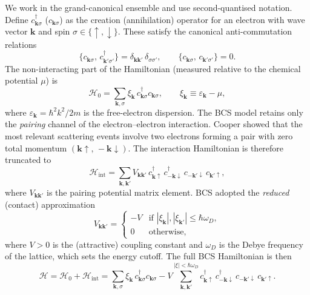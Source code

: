 We work in the grand-canonical ensemble and use second-quantised notation.
Define $c^\dagger_{\mathbf{k}\sigma}$ ($c_{\mathbf{k}\sigma}$) as the creation
(annihilation) operator for an electron with wave vector $\mathbf{k}$ and spin
$\sigma \in \{\uparrow, \downarrow\}$. These satisfy the canonical
anti-commutation relations
\begin{equation}
	\{c_{\mathbf{k}\sigma},\, c^\dagger_{\mathbf{k}'\sigma'}\}
	= \delta_{\mathbf{k}\mathbf{k}'}\,\delta_{\sigma\sigma'}, \qquad
	\{c_{\mathbf{k}\sigma},\, c_{\mathbf{k}'\sigma'}\} = 0.
\end{equation}
The non-interacting part of the Hamiltonian (measured relative to the chemical
potential $\mu$) is
\begin{equation}
	\mathcal{H}_0 = \sum_{\mathbf{k},\sigma} \xi_{\mathbf{k}}\,
	c^\dagger_{\mathbf{k}\sigma} c_{\mathbf{k}\sigma}, \qquad
	\xi_{\mathbf{k}} \equiv \varepsilon_{\mathbf{k}} - \mu,
\end{equation}
where $\varepsilon_{\mathbf{k}} = \hbar^2 k^2 / 2m$ is the free-electron
dispersion. The BCS model retains only the \emph{pairing} channel of the
electron--electron interaction. Cooper showed that the most relevant scattering
events involve two electrons forming a pair with zero total momentum
$(\mathbf{k}\uparrow,\,-\mathbf{k}\downarrow)$. The interaction Hamiltonian is
therefore truncated to
\begin{equation}
	\mathcal{H}_{\mathrm{int}} = \sum_{\mathbf{k},\mathbf{k}'}
	V_{\mathbf{k}\mathbf{k}'}\,
	c^\dagger_{\mathbf{k}\uparrow}\, c^\dagger_{-\mathbf{k}\downarrow}\,
	c_{-\mathbf{k}'\downarrow}\, c_{\mathbf{k}'\uparrow},
\end{equation}
where $V_{\mathbf{k}\mathbf{k}'}$ is the pairing potential matrix element.
BCS adopted the \emph{reduced} (contact) approximation
\begin{equation}
	V_{\mathbf{k}\mathbf{k}'} =
	\begin{cases}
		-V & \text{if } |\xi_{\mathbf{k}}|, |\xi_{\mathbf{k}'}| \leq \hbar\omega_D, \\
		0  & \text{otherwise},
	\end{cases}
	\label{eq:BCS_potential}
\end{equation}
where $V > 0$ is the (attractive) coupling constant and $\omega_D$ is the Debye
frequency of the lattice, which sets the energy cutoff. The full BCS
Hamiltonian is then
\begin{equation}
	\mathcal{H} = \mathcal{H}_0 + \mathcal{H}_{\mathrm{int}}
	= \sum_{\mathbf{k},\sigma} \xi_{\mathbf{k}}\,c^\dagger_{\mathbf{k}\sigma}
	c_{\mathbf{k}\sigma}
	- V \sum_{\mathbf{k},\mathbf{k}'}^{|\xi|<\hbar\omega_D}
	c^\dagger_{\mathbf{k}\uparrow}\, c^\dagger_{-\mathbf{k}\downarrow}\,
	c_{-\mathbf{k}'\downarrow}\, c_{\mathbf{k}'\uparrow}.
	\label{eq:H_BCS}
\end{equation}

